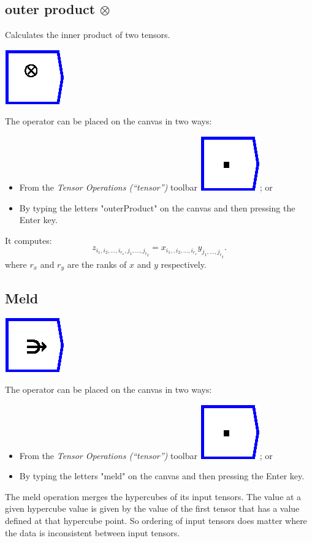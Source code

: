 \subsection{outer product $\otimes$}

\label{Operation:outerProduct} Calculates the inner product of two
tensors.

\includegraphics{images/outerProduct}

The operator can be placed on the canvas in two ways:
\begin{itemize}
\item From the \emph{Tensor Operations (``tensor'')} toolbar \includegraphics{images/innerProduct};
or 
\item By typing the letters "outerProduct" on the canvas and then pressing
the Enter key.
\end{itemize}
It computes: 
\[
z_{i_{1},i_{2},\ldots,i_{r_{x}},j_{1},\ldots,j_{r_{y}}}=x_{i_{1},,i_{2},\ldots,i_{r_{x}}}y_{j_{1},\ldots,j_{r_{y}}}.
\]
where $r_{x}$ and $r_{y}$ are the ranks of $x$ and $y$ respectively.

\subsection{Meld}

\label{Operation:meld}

\includegraphics{images/meld}

The operator can be placed on the canvas in two ways:
\begin{itemize}
\item From the \emph{Tensor Operations (``tensor'')} toolbar \includegraphics{images/innerProduct};
or 
\item By typing the letters "meld" on the canvas and then pressing the
Enter key.
\end{itemize}
The meld operation merges the hypercubes of its input tensors. The
value at a given hypercube value is given by the value of the first
tensor that has a value defined at that hypercube point. So ordering
of input tensors does matter where the data is inconsistent between
input tensors.

